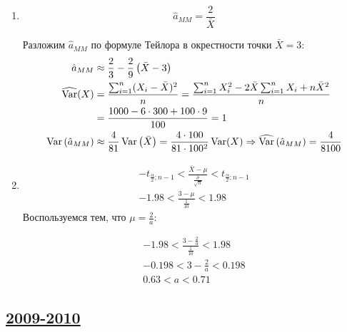 \begin{enumerate}
\begin{enumerate}
\item
\[
\hat{a}_{MM}=\frac{2}{\bar{X}}
\]

Разложим $\hat{a}_{MM}$ по формуле Тейлора в окрестности точки $\bar{X}=3$:
\begin{align*}
\hat{a}_{MM} &\approx \frac{2}{3} - \frac{2}{9}\left(\bar{X}-3\right) \\
\widehat{\operatorname{Var}}(X) &= \frac{\sum^n_{i=1}(X_i-\bar{X})^2}{n}=\frac{\sum^n_{i=1}X_i^2-2\bar{X}\sum^n_{i=1}X_i+n\bar{X}^2}{n} \\
&= \frac{1000 - 6\cdot300 + 100\cdot9}{100} = 1 \\
\operatorname{Var}\left(\hat{a}_{MM}\right) &\approx \frac{4}{81}\operatorname{Var}\left(\bar{X}\right) = \frac{4\cdot100}{81\cdot100^2} \operatorname{Var}(X)\Rightarrow \widehat{\operatorname{Var}}\left(\hat{a}_{MM}\right) = \frac{4}{8100}
\end{align*}
\item
\begin{align*}
-t_{\frac{\alpha}{2};n-1}<\frac{\bar{X}-\mu}{\frac{\hat{\sigma}}{\sqrt{n}}}<t_{\frac{\alpha}{2};n-1} \\
-1.98<\frac{3-\mu}{\frac{1}{10}}<1.98
\end{align*}
Воспользуемся тем, что $\mu=\frac{2}{a}$:

\begin{align*}
-1.98<\frac{3-\frac{2}{a}}{\frac{1}{10}}<1.98 \\
-0.198<3-\frac{2}{a}<0.198 \\
0.63<a<0.71
\end{align*}

\end{enumerate}
\end{enumerate}


\subsection[2009-2010]{\hyperref[sec:kr_04_2009_2010]{2009-2010}}
\label{sec:sol_kr_04_2009_2010}
